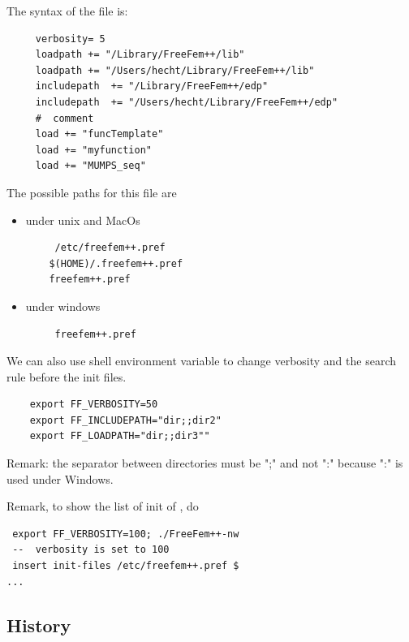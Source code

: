 \documentclass[a4paper,twoside,12pt]{book}
\begin{document}
The syntax of the file  is:
\begin{verbatim}
     verbosity= 5
     loadpath += "/Library/FreeFem++/lib"
     loadpath += "/Users/hecht/Library/FreeFem++/lib"
     includepath  += "/Library/FreeFem++/edp"
     includepath  += "/Users/hecht/Library/FreeFem++/edp"
     #  comment
     load += "funcTemplate"
     load += "myfunction"
     load += "MUMPS_seq" 
\end{verbatim}

The possible paths for this file  are
 \begin{itemize}
   \item under unix and MacOs
\begin{verbatim}
	 /etc/freefem++.pref
    $(HOME)/.freefem++.pref
    freefem++.pref
\end{verbatim}
  \item under windows
\begin{verbatim}
     freefem++.pref
\end{verbatim}
\end{itemize}

We can also use shell environment variable to change verbosity and
the search rule before the init files.

\begin{verbatim}
    export FF_VERBOSITY=50
    export FF_INCLUDEPATH="dir;;dir2"
    export FF_LOADPATH="dir;;dir3""
\end{verbatim}

 Remark: the separator between directories must be ";" and not ":" because ":" is used under Windows.

 Remark, to show the list of init of \freefempp, do
\begin{verbatim}
 export FF_VERBOSITY=100; ./FreeFem++-nw
 --  verbosity is set to 100
 insert init-files /etc/freefem++.pref $
...
\end{verbatim}

\subsection{History}
\end{document}
